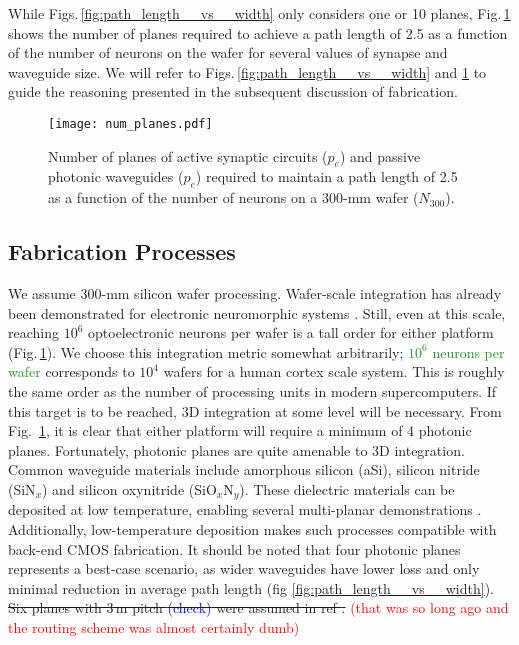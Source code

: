 \documentclass[twocolumn]{article}
\begin{document}
While Figs.\,\ref{fig:path_length__vs__width} only considers one or 10 planes, Fig.\,\ref{fig:num_planes} shows the number of planes required to achieve a path length of 2.5 as a function of the number of neurons on the wafer for several values of synapse and waveguide size. We will refer to Figs.\,\ref{fig:path_length__vs__width} and \ref{fig:num_planes} to guide the reasoning presented in the subsequent discussion of fabrication.
\begin{figure}
    \centering
    \texttt{[image: num\_planes.pdf]} 
    \caption{Number of planes of active synaptic circuits ($p_e$) and passive photonic waveguides ($p_e$) required to maintain a path length of 2.5 as a function of the number of neurons on a 300-mm wafer ($N_{300}$).}
    \label{fig:num_planes}
\end{figure}

\subsection{Fabrication Processes}
\label{sec:fabrication}
We assume 300-mm silicon wafer processing. Wafer-scale integration has already been demonstrated for electronic neuromorphic systems \cite{schemmel2010wafer}. Still, even at this scale, reaching $10^6$ optoelectronic neurons per wafer is a tall order for either platform (Fig.\,\ref{fig:num_planes}). We choose this integration metric somewhat arbitrarily; \textcolor{ForestGreen}{$10^6$ neurons per wafer} corresponds to $10^4$ wafers for a human cortex scale system. This is roughly the same order as the number of processing units in modern supercomputers. If this target is to be reached, 3D integration at some level will be necessary. From Fig.\, \ref{fig:num_planes}, it is clear that either platform will require a minimum of 4 photonic planes. Fortunately, photonic planes are quite amenable to 3D integration. Common waveguide materials include amorphous silicon (aSi), silicon nitride (SiN$_x$) and silicon oxynitride (SiO$_x$N$_y$). These dielectric materials can be deposited at low temperature, enabling several multi-planar demonstrations \cite{shpa2015,sahu2015,chbu2017,zhli2018}. Additionally, low-temperature deposition makes such processes compatible with back-end CMOS fabrication. It should be noted that four photonic planes represents a best-case scenario, as wider waveguides have lower loss and only minimal reduction in average path length (fig \ref{fig:path_length__vs__width}). \sout{Six planes with 3\,\textmu m pitch \textcolor{blue}{(check)} were assumed in ref \cite{shainline2017superconducting}.} \textcolor{red}{(that was so long ago and the routing scheme was almost certainly dumb)}
\end{document}
